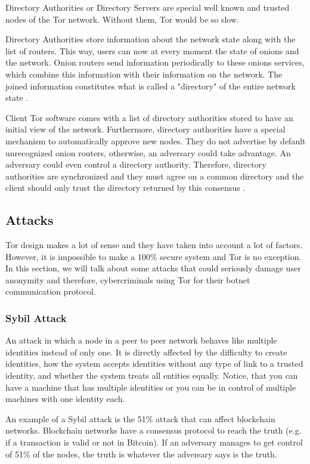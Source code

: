 \documentclass[11pt, a4paper,twoside]{tesi_upf}
\begin{document}
Directory Authorities or Directory Servers are special well known and trusted nodes of the Tor network. Without them, Tor would be so slow.

Directory Authorities store information about the network state along with the list of routers. This way, users can now at every moment the state of onions and the network. Onion routers send information periodically to these onions services, which combine this information with their information on the network. The joined information constitutes what is called a "directory" of the entire network state \cite{tor-whitepaper}.

Client Tor software comes with a list of directory authorities stored to have an initial view of the network. Furthermore, directory authorities have a special mechanism to automatically approve new nodes. They do not advertise by default unrecognized onion routers, otherwise, an adversary could take advantage. An adversary could even control a directory authority. Therefore, directory authorities are synchronized and they must agree on a common directory and the client should only trust the directory returned by this consensus \cite{tor-whitepaper}.

\subsection{Attacks}
\label{tor-attacks}

Tor design makes a lot of sense and they have taken into account a lot of factors. However, it is impossible to make a 100\% secure system and Tor is no exception. In this section, we will talk about some attacks that could seriously damage user anonymity and therefore, cybercriminals using Tor for their botnet communication protocol.

\subsubsection{Sybil Attack}

An attack in which a node in a peer to peer network behaves like multiple identities instead of only one. It is directly affected by the difficulty to create identities, how the system accepts identities without any type of link to a trusted identity, and whether the system treats all entities equally.
Notice, that you can have a machine that has multiple identities or you can be in control of multiple machines with one identity each.

An example of a Sybil attack is the 51\% attack that can affect blockchain networks. Blockchain networks have a consensus protocol to reach the truth (e.g. if a transaction is valid or not in Bitcoin). If an adversary manages to get control of 51\% of the nodes, the truth is whatever the adversary says is the truth.
\end{document}
